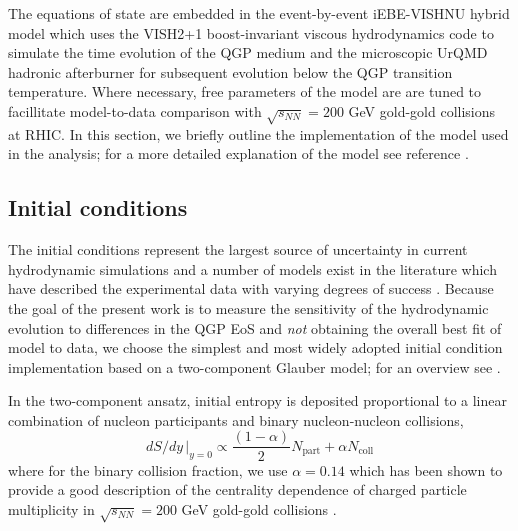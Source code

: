 \documentclass[aps,prc,reprint,amsmath,nofootinbib,superscriptaddress]{revtex4-1}
\begin{document}
The equations of state are embedded in the event-by-event iEBE-VISHNU hybrid model which uses the VISH2+1 boost-invariant viscous hydrodynamics code \cite{Song:2007ux} to simulate the 
time evolution of the QGP medium and the microscopic UrQMD hadronic afterburner \cite{Bass:1998ca, Bleicher:1999xi} for subsequent evolution below the QGP transition temperature. Where necessary, free parameters of the model are are tuned to facillitate model-to-data comparison with $\sqrt{s_{NN}}=200$ GeV gold-gold collisions at RHIC. In this section, we briefly outline
the implementation of the model used in the analysis; for a more detailed explanation of the model see reference \cite{Shen:2014vra}. 


\subsection{Initial conditions}
\label{initial_condition}

The initial conditions represent the largest source of uncertainty in current hydrodynamic simulations and a number of models exist in the literature which have described
the experimental data with varying degrees of success \cite{Schenke:2012wb, Niemi:2015qia, Chatterjee:2015aja, Moreland:2014oya, Drescher:2006pi, Adler:2013aqf}. Because the goal of the present work is to measure the sensitivity of the hydrodynamic evolution to differences in the QGP EoS and \emph{not} obtaining the overall best fit of model to data, we choose the simplest and most widely adopted initial condition implementation based on a two-component Glauber model; for an overview see \cite{Miller:2007ri}.

In the two-component ansatz, initial entropy is deposited proportional to a linear combination of nucleon participants and binary nucleon-nucleon collisions,
\begin{equation}
 dS/dy \,\vert_{y=0} \propto \frac{(1-\alpha)}{2}N_\text{part} + \alpha N_\text{coll}
 \label{twocomponent}
\end{equation}
where for the binary collision fraction, we use $\alpha=0.14$ which has been shown to provide a good description of the centrality dependence of charged particle 
multiplicity in $\sqrt{s_{NN}}=200$ GeV gold-gold collisions \cite{Shen:2014sfi}.
\end{document}

